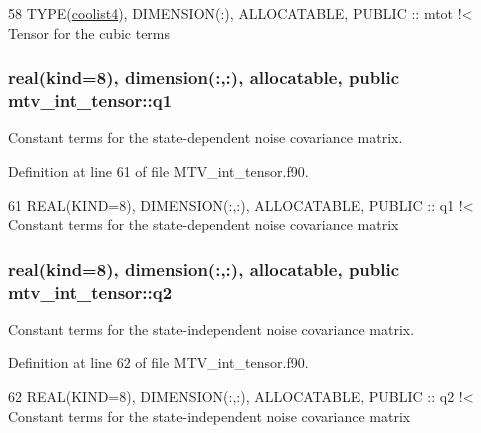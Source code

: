 \begin{DoxyCode}
58   \textcolor{keywordtype}{TYPE}(\hyperlink{structtensor_1_1coolist4}{coolist4}), \textcolor{keywordtype}{DIMENSION(:)}, \textcolor{keywordtype}{ALLOCATABLE}, \textcolor{keywordtype}{PUBLIC} :: mtot\textcolor{comment}{ !< Tensor for the cubic terms}
\end{DoxyCode}
\subsubsection[{\texorpdfstring{q1}{q1}}]{\setlength{\rightskip}{0pt plus 5cm}real(kind=8), dimension(\+:,\+:), allocatable, public mtv\+\_\+int\+\_\+tensor\+::q1}\hypertarget{namespacemtv__int__tensor_a2677249c594dbc196d1554e751257d1c}{}\label{namespacemtv__int__tensor_a2677249c594dbc196d1554e751257d1c}


Constant terms for the state-\/dependent noise covariance matrix. 



Definition at line 61 of file M\+T\+V\+\_\+int\+\_\+tensor.\+f90.


\begin{DoxyCode}
61   \textcolor{keywordtype}{REAL(KIND=8)}, \textcolor{keywordtype}{DIMENSION(:,:)}, \textcolor{keywordtype}{ALLOCATABLE}, \textcolor{keywordtype}{PUBLIC} :: q1\textcolor{comment}{ !< Constant terms for the state-dependent noise
       covariance matrix}
\end{DoxyCode}
\subsubsection[{\texorpdfstring{q2}{q2}}]{\setlength{\rightskip}{0pt plus 5cm}real(kind=8), dimension(\+:,\+:), allocatable, public mtv\+\_\+int\+\_\+tensor\+::q2}\hypertarget{namespacemtv__int__tensor_a83f1ba468ee4599801c226c93115bad3}{}\label{namespacemtv__int__tensor_a83f1ba468ee4599801c226c93115bad3}


Constant terms for the state-\/independent noise covariance matrix. 



Definition at line 62 of file M\+T\+V\+\_\+int\+\_\+tensor.\+f90.


\begin{DoxyCode}
62   \textcolor{keywordtype}{REAL(KIND=8)}, \textcolor{keywordtype}{DIMENSION(:,:)}, \textcolor{keywordtype}{ALLOCATABLE}, \textcolor{keywordtype}{PUBLIC} :: q2\textcolor{comment}{ !< Constant terms for the state-independent noise
       covariance matrix}
\end{DoxyCode}
